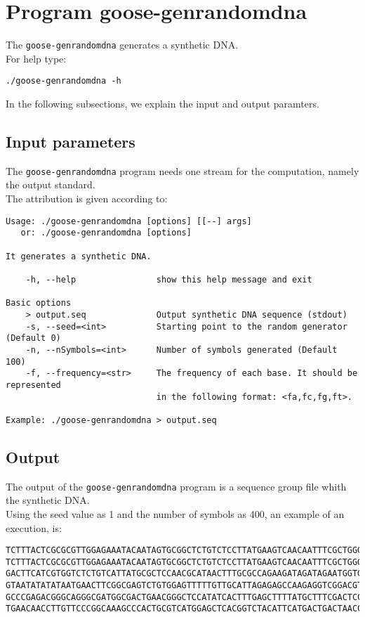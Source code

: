 \section{Program goose-genrandomdna}
The \texttt{goose-genrandomdna} generates a synthetic DNA.\\
For help type:
\begin{lstlisting}
./goose-genrandomdna -h
\end{lstlisting}
In the following subsections, we explain the input and output paramters.

\subsection*{Input parameters}

The \texttt{goose-genrandomdna} program needs one stream for the computation,
namely the output standard.\\
The attribution is given according to:
\begin{lstlisting}
Usage: ./goose-genrandomdna [options] [[--] args]
   or: ./goose-genrandomdna [options]

It generates a synthetic DNA.

    -h, --help                show this help message and exit

Basic options
    > output.seq              Output synthetic DNA sequence (stdout)
    -s, --seed=<int>          Starting point to the random generator (Default 0)
    -n, --nSymbols=<int>      Number of symbols generated (Default 100)
    -f, --frequency=<str>     The frequency of each base. It should be represented 
    						  in the following format: <fa,fc,fg,ft>.

Example: ./goose-genrandomdna > output.seq
\end{lstlisting}

\subsection*{Output}
The output of the \texttt{goose-genrandomdna} program is a sequence group file whith the synthetic DNA.\\
Using the seed value as 1 and the number of symbols as 400, an example of an execution, is: 
\begin{lstlisting}
TCTTTACTCGCGCGTTGGAGAAATACAATAGTGCGGCTCTGTCTCCTTATGAAGTCAACAATTTCGCTGGGACTTGCGGC
TCTTTACTCGCGCGTTGGAGAAATACAATAGTGCGGCTCTGTCTCCTTATGAAGTCAACAATTTCGCTGGGACTTGCGGC
GACTTCATCGTGGTCTCTGTCATTATGCGCTCCAACGCATAACTTTGCGCCAGAAGATAGATAGAATGGTGTAAGAAACT
GTAATATATATAATGAACTTCGGCGAGTCTGTGGAGTTTTTGTTGCATTAGAGAGCCAAGAGGTCGGACGTCCTCACGTA
GCCCGAGACGGGCAGGGCGATGGCGACTGAACGGGCTCCATATCACTTTGAGCTTTTATGCTTTCGACTCCTCCAGGAGC
TGAACAACCTTGTTCCCGGCAAAGCCCACTGCGTCATGGAGCTCACGGTCTACATTCATGACTGACTAACCGTAAACTGC
\end{lstlisting}
